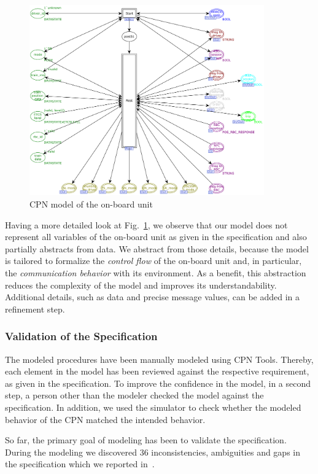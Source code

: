 \begin{figure}[tb]
	\centering
		\includegraphics[width=0.9\textwidth]{figures/OBUnit.pdf}
	\caption{CPN model of the on-board unit}
	\label{fig:OBUnit}
\end{figure}

Having a more detailed look at Fig.~\ref{fig:OBUnit}, we observe that our model does not represent all variables of the on-board unit as given in the specification and also partially abstracts from data. We abstract from those details, because the model is tailored to formalize the \textit{control flow} of the on-board unit and, in particular, the \textit{communication behavior} with its environment. As a benefit, this abstraction reduces the complexity of the model and improves its understandability. Additional details, such as data and precise message values, can be added in a refinement step.


\subsubsection{Validation of the Specification}

The modeled procedures have been manually modeled using CPN Tools. Thereby, each element in the model has been reviewed against the respective requirement, as given in the specification. To improve the confidence in the model, in a second step, a person other than the modeler checked the model against the specification. In addition, we used the simulator to check whether the modeled behavior of the CPN matched the intended behavior.

So far, the primary goal of modeling has been to validate the specification. During the modeling we discovered 36 inconsistencies, ambiguities and gaps in the specification which we reported in~\cite{specfindings}. 

